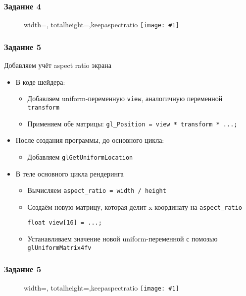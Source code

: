 \documentclass{beamer}
\newcommand{\slideimage}[1]{
  \begin{figure}
    \begin{adjustbox}{width=\textwidth, totalheight=\textheight-2\baselineskip-2\baselineskip,keepaspectratio}
      \texttt{[image: \#1]}
    \end{adjustbox}
  \end{figure}
}
\begin{document}
\begin{frame}
\frametitle{Задание 4}
\slideimage{4.png}
\end{frame}

\begin{frame}[fragile]
\frametitle{Задание 5}
Добавляем учёт aspect ratio экрана
\begin{itemize}
\item В коде шейдера:
\begin{itemize}
\item Добавляем uniform-переменную \verb|view|, аналогичную переменной \verb|transform|
\item Применяем обе матрицы: \verb|gl_Position = view * transform * ...;|
\end{itemize}
\item После создания программы, до основного цикла:
\begin{itemize}
\item Добавляем \verb|glGetUniformLocation|
\end{itemize}
\item В теле основного цикла рендеринга
\begin{itemize}
\item Вычисляем \verb|aspect_ratio = width / height|
\item Создаём новую матрицу, которая делит x-координату на \verb|aspect_ratio|
\begin{verbatim}
float view[16] = ...;
\end{verbatim}
\item Устанавливаем значение новой uniform-переменной с помозью \verb|glUniformMatrix4fv|
\end{itemize}
\end{itemize}
\end{frame}

\begin{frame}
\frametitle{Задание 5}
\slideimage{5.png}
\end{frame}
\end{document}
